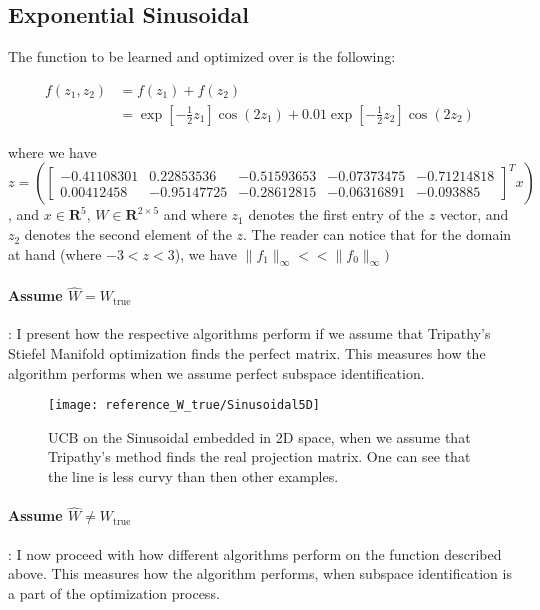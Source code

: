 \subsection{Exponential Sinusoidal}

The function to be learned and optimized over is the following:

\def\WSinusoidal5D{
\begin{bmatrix}
		-0.41108301 & 0.22853536 & -0.51593653 & -0.07373475 & -0.71214818 \\
           0.00412458 & -0.95147725 & -0.28612815 & -0.06316891 & -0.093885
\end{bmatrix}}

\begin{align}
f(z_1, z_2) & = f(z_1) + f(z_2) \\
& = \exp{\left[-\frac{1}{2} z_1 \right]}   \cos{(2 z_1)} + 0.01   \exp{\left[-\frac{1}{2} z_2 \right] }   \cos{(2 z_2)}
\end{align}

where we have \\
$z = \left( \WSinusoidal5D^T x \right) $, and $ x \in \mathbf{R}^5$, $W \in \mathbf{R}^{2 \times 5}$
and where $z_1$ denotes the first entry of the $z$ vector, and $z_2$ denotes the second element of the $z$.
The reader can notice that for the domain at hand (where $-3 < z < 3$), we have $ \lVert f_1 \rVert_{\infty} << \lVert f_0 \rVert_{\infty})$

\paragraph{Assume $\hat{W} = W_{\text{true}}$}: I present how the respective algorithms perform if we assume that Tripathy's Stiefel Manifold optimization finds the perfect matrix.
This measures how the algorithm performs when we assume perfect subspace identification.

\begin{figure}[H]
  \centering
      \texttt{[image: reference\_W\_true/Sinusoidal5D]}
  \caption{UCB on the Sinusoidal embedded in 2D space, when we assume that Tripathy's method finds the real projection matrix.
  One can see that the line is less curvy than then other examples.}
\end{figure}

\paragraph{Assume $\hat{W} \neq W_{\text{true}}$}: I now proceed with how different algorithms perform on the function described above.
This measures how the algorithm performs, when subspace identification is a part of the optimization process.

